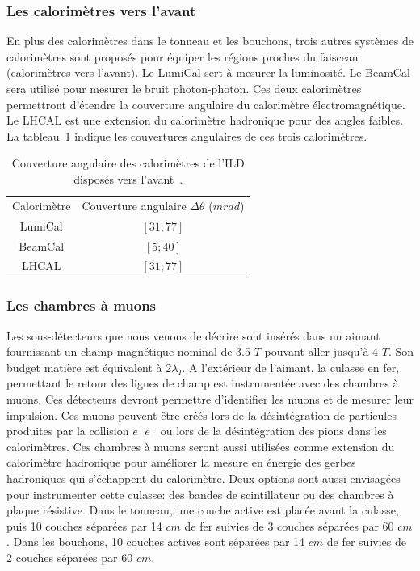 \subsubsection{Les calorimètres vers l'avant}
En plus des calorimètres dans le tonneau et les bouchons, trois autres systèmes de calorimètres sont proposés pour équiper les régions proches du faisceau (calorimètres vers l'avant). Le LumiCal sert à mesurer la luminosité. Le BeamCal sera utilisé pour mesurer le bruit photon-photon. Ces deux calorimètres permettront d'étendre la couverture angulaire du calorimètre électromagnétique. Le LHCAL est une extension du calorimètre hadronique pour des angles faibles. La tableau~\ref{tab.forwardCalo} indique les couvertures angulaires de ces trois calorimètres.
\begin{table}[!ht]
  \begin{center}
    \begin{tabular}{c|c}
      \rowcolor{black!20!white} Calorimètre & Couverture angulaire $\Delta\theta$ ($mrad$) \\
      \rowcolor{black!5!white} LumiCal & $[31;77]$ \\
      \rowcolor{black!5!white} BeamCal & $[5;40]$ \\
      \rowcolor{black!5!white} LHCAL & $[31;77]$ \\
    \end{tabular}
  \end{center}
  \caption{Couverture angulaire des calorimètres de l'ILD disposés vers l'avant~\cite{detectorTDR}.}
  \label{tab.forwardCalo}
\end{table}

\subsubsection{Les chambres à muons}
Les sous-détecteurs que nous venons de décrire sont insérés dans un aimant fournissant un champ magnétique nominal de 3.5 $T$ pouvant aller jusqu'à 4 $T$. Son budget matière est équivalent à 2$\lambda_I$. A l'extérieur de l'aimant, la culasse en fer, permettant le retour des lignes de champ est instrumentée avec des chambres à muons. Ces détecteurs devront permettre d'identifier les muons et de mesurer leur impulsion. Ces muons peuvent être créés lors de la désintégration de particules produites par la collision $e^+e^-$ ou lors de la désintégration des pions dans les calorimètres. Ces chambres à muons seront aussi utilisées comme extension du calorimètre hadronique pour améliorer la mesure en énergie des gerbes hadroniques qui s'échappent du calorimètre. Deux options sont aussi envisagées pour instrumenter cette culasse: des bandes de scintillateur ou des chambres à plaque résistive. Dans le tonneau, une couche active est placée avant la culasse, puis 10 couches séparées par 14 $cm$ de fer suivies de 3 couches séparées par 60 $cm$. Dans les bouchons, 10 couches actives sont séparées par 14 $cm$ de fer suivies de 2 couches séparées par 60 $cm$.

